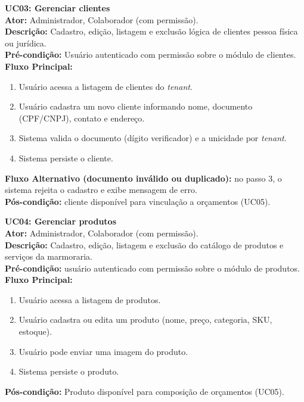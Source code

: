 \medskip
\noindent\textbf{UC03: Gerenciar clientes}\\
\textbf{Ator:} Administrador, Colaborador (com permissão).\\
\textbf{Descrição:} Cadastro, edição, listagem e exclusão lógica de clientes pessoa física ou jurídica.\\
\textbf{Pré-condição:} Usuário autenticado com permissão sobre o módulo de clientes.\\
\textbf{Fluxo Principal:}
\begin{enumerate}
  \item Usuário acessa a listagem de clientes do \textit{tenant}.
  \item Usuário cadastra um novo cliente informando nome, documento (CPF/CNPJ), contato e endereço.
  \item Sistema valida o documento (dígito verificador) e a unicidade por \textit{tenant}.
  \item Sistema persiste o cliente.
\end{enumerate}
\textbf{Fluxo Alternativo (documento inválido ou duplicado):} no passo 3, o sistema rejeita o cadastro e exibe mensagem de erro.\\
\textbf{Pós-condição:} cliente disponível para vinculação a orçamentos (UC05).

\medskip
\noindent\textbf{UC04: Gerenciar produtos}\\
\textbf{Ator:} Administrador, Colaborador (com permissão).\\
\textbf{Descrição:} Cadastro, edição, listagem e exclusão do catálogo de produtos e serviços da marmoraria.\\
\textbf{Pré-condição:} usuário autenticado com permissão sobre o módulo de produtos.\\
\textbf{Fluxo Principal:}
\begin{enumerate}
  \item Usuário acessa a listagem de produtos.
  \item Usuário cadastra ou edita um produto (nome, preço, categoria, SKU, estoque).
  \item Usuário pode enviar uma imagem do produto.
  \item Sistema persiste o produto.
\end{enumerate}
\textbf{Pós-condição:} Produto disponível para composição de orçamentos (UC05).

